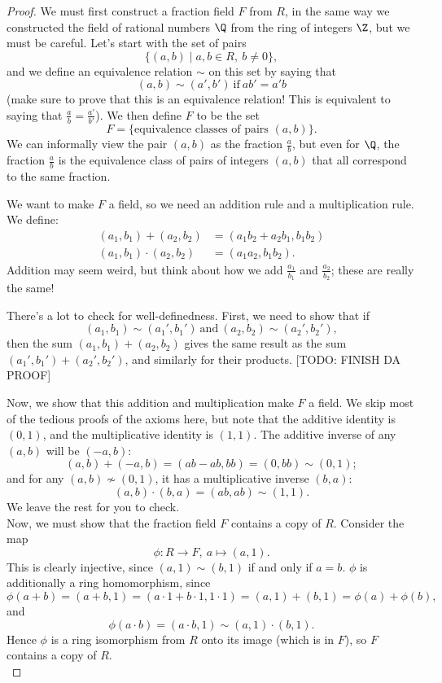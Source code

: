 \documentclass[math1530-lecture-notes]{subfiles}
\begin{document}
\begin{proof}[Proof]
  We must first construct a fraction field $F$ from $R$, in the same way we constructed the field of
  rational numbers $\Q$ from the ring of integers $\Z$, but we must be careful. Let's start with the
  set of pairs \[
    \{(a,b)\mid a,b\in R,\ b\neq 0\} 
  ,\] and we define an equivalence relation $\sim$ on this set by saying that \[
    (a,b)\sim (a',b')~\text{if}~ab'=a'b
  \] (make sure to prove that this is an equivalence relation! This is equivalent to saying that
  $\frac{a}{b}=\frac{a'}{b'}$). We then define $F$ to be the set \[
    F=\{ \text{equivalence classes of pairs $(a,b)$} \}
  .\] We can informally view the pair $(a,b)$ as the fraction $\frac{a}{b}$, but even for $\Q$, the
  fraction $\frac{a}{b}$ is the equivalence class of pairs of integers $(a,b)$ that all correspond to
  the same fraction.

  We want to make $F$ a field, so we need an addition rule and a multiplication rule. We define:
  \begin{align*}
    (a_1,b_1)+(a_2,b_2)&= (a_1b_2+a_2b_1,b_1b_2) \\
    (a_1,b_1)\cdot (a_2,b_2)&=(a_1a_2,b_1b_2)
  .\end{align*}
  Addition may seem weird, but think about how we add $\frac{a_1}{b_1}$ and $\frac{a_2}{b_2}$; these
  are really the same!

  There's a lot to check for well-definedness. First, we need to show that if \[
    (a_1,b_1)\sim (a_1',b_1') ~\text{and}~(a_2,b_2)\sim (a_2',b_2')
  ,\] then the sum $(a_1,b_1)+(a_2,b_2)$ gives the same result as the sum $(a_1',b_1')+(a_2',b_2')$,
  and similarly for their products. 
  [TODO: FINISH DA PROOF]

  Now, we show that this addition and multiplication make $F$ a field. We skip most of the tedious
  proofs of the axioms here, but note that the additive identity is $(0,1)$, and the multiplicative
  identity is $(1,1)$. The additive inverse of any $(a,b)$ will be $(-a,b)$: \[
    (a,b)+(-a,b)=(ab-ab,bb)=(0,bb)\sim (0,1)
  ;\] and for any $(a,b)\not\sim (0,1)$, it has a multiplicative inverse $(b,a)$: \[
    (a,b)\cdot (b,a)=(ab,ab)\sim (1,1)
  .\] We leave the rest for you to check.\\

  Now, we must show that the fraction field $F$ contains a copy of $R$. Consider the map \[
    \phi:R\longrightarrow F,\ a\longmapsto (a,1)
  .\] This is clearly injective, since $(a,1)\sim (b,1)$ if and only if $a=b$. $\phi$ is
  additionally a ring homomorphism, since \[
    \phi(a+b)=(a+b,1)=(a\cdot 1+b\cdot 1,1\cdot 1)=(a,1)+(b,1)=\phi(a)+\phi(b)
  ,\] and \[
  \phi(a\cdot b)=(a\cdot b,1)\sim (a,1)\cdot (b,1)
  .\] Hence $\phi$ is a ring isomorphism from $R$ onto its image (which is in $F$), so $F$ contains a
  copy of $R$.\\


\end{proof}
\end{document}
